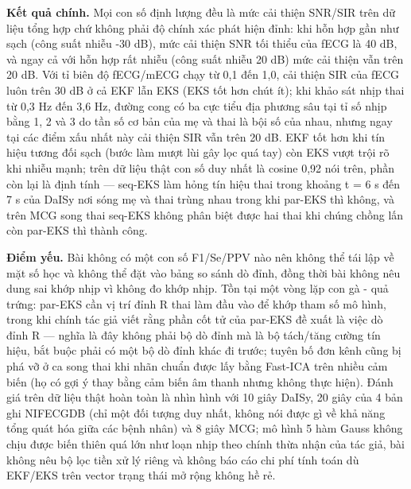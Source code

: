 \documentclass[12pt,a4paper]{article}
\begin{document}
\noindent \textbf{Kết quả chính.} Mọi con số định lượng đều là mức cải thiện SNR/SIR trên dữ liệu tổng hợp chứ không phải độ chính xác phát hiện đỉnh: khi hỗn hợp gần như sạch (công suất nhiễu -30 dB), mức cải thiện SNR tối thiểu của fECG là 40 dB, và ngay cả với hỗn hợp rất nhiễu (công suất nhiễu 20 dB) mức cải thiện vẫn trên 20 dB. Với tỉ biên độ fECG/mECG chạy từ 0,1 đến 1,0, cải thiện SIR của fECG luôn trên 30 dB ở cả EKF lẫn EKS (EKS tốt hơn chút ít); khi khảo sát nhịp thai từ 0,3 Hz đến 3,6 Hz, đường cong có ba cực tiểu địa phương sâu tại tỉ số nhịp bằng 1, 2 và 3 do tần số cơ bản của mẹ và thai là bội số của nhau, nhưng ngay tại các điểm xấu nhất này cải thiện SIR vẫn trên 20 dB. EKF tốt hơn khi tín hiệu tương đối sạch (bước làm mượt lùi gây lọc quá tay) còn EKS vượt trội rõ khi nhiễu mạnh; trên dữ liệu thật con số duy nhất là cosine 0,92 nói trên, phần còn lại là định tính — seq-EKS làm hỏng tín hiệu thai trong khoảng t = 6 s đến 7 s của DaISy nơi sóng mẹ và thai trùng nhau trong khi par-EKS thì không, và trên MCG song thai seq-EKS không phân biệt được hai thai khi chúng chồng lấn còn par-EKS thì thành công.\par\vspace{3pt}
\noindent \textbf{Điểm yếu.} Bài không có một con số F1/Se/PPV nào nên không thể tái lập về mặt số học và không thể đặt vào bảng so sánh dò đỉnh, đồng thời bài không nêu dung sai khớp nhịp vì không đo khớp nhịp. Tồn tại một vòng lặp con gà - quả trứng: par-EKS cần vị trí đỉnh R thai làm đầu vào để khớp tham số mô hình, trong khi chính tác giả viết rằng phần cốt tử của par-EKS đề xuất là việc dò đỉnh R — nghĩa là đây không phải bộ dò đỉnh mà là bộ tách/tăng cường tín hiệu, bắt buộc phải có một bộ dò đỉnh khác đi trước; tuyên bố đơn kênh cũng bị phá vỡ ở ca song thai khi nhãn chuẩn được lấy bằng Fast-ICA trên nhiều cảm biến (họ có gợi ý thay bằng cảm biến âm thanh nhưng không thực hiện). Đánh giá trên dữ liệu thật hoàn toàn là nhìn hình với 10 giây DaISy, 20 giây của 4 bản ghi NIFECGDB (chỉ một đối tượng duy nhất, không nói được gì về khả năng tổng quát hóa giữa các bệnh nhân) và 8 giây MCG; mô hình 5 hàm Gauss không chịu được biến thiên quá lớn như loạn nhịp theo chính thừa nhận của tác giả, bài không nêu bộ lọc tiền xử lý riêng và không báo cáo chi phí tính toán dù EKF/EKS trên vector trạng thái mở rộng không hề rẻ.\par\vspace{3pt}
\end{document}
